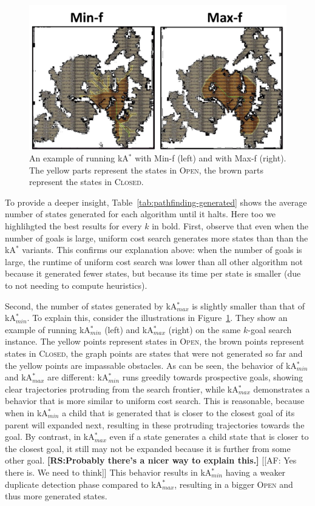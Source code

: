 \documentclass{aicom2e}
\newcommand{\kgs}{$k$-goal search}
\newcommand{\kastar}{kA$^*$}
\newcommand{\kastarmin}{kA$^*_{min}$}
\newcommand{\kastarmax}{kA$^*_{max}$}
\newcommand{\minf}{Min-f}
\newcommand{\maxf}{Max-f}
\newcommand{\open}{\textsc{Open}}
\newcommand{\closed}{\textsc{Closed}}
\newcommand{\roni}[1]{\textbf{[RS:#1]}}
\begin{document}
\begin{figure}
	\includegraphics[width=\columnwidth]{min-vs-max}      
	\caption{An example of running \kastar{} with \minf{} (left) and with \maxf{} (right). The yellow parts represent the states in \open{}, the brown parts represent the states in \closed{}.}
	\label{fig:min-vs-max}
\end{figure}

To provide a deeper insight, Table~\ref{tab:pathfinding-generated} shows the average number of states generated for each algorithm until it halts. Here too we highlihgted the best results for every $k$ in bold. 
First, observe that even when the number of goals is large, uniform cost search generates more states than than the \kastar{} variants. This confirms our explanation above: when the number of goals is large, the  runtime of uniform cost search was lower than all other algorithm not because it generated fewer states, but because its time per state is smaller (due to not needing to compute heuristics). 

Second, the number of states generated by \kastarmax{} is slightly smaller than that of \kastarmin{}. To explain this, consider the illustrations in Figure~\ref{fig:min-vs-max}. They show an example of running \kastarmin{} (left) and \kastarmax{} (right) on the same \kgs{} instance. The yellow points represent states in \open{}, the brown points represent states in \closed{}, the graph points are states that were not generated so far and the yellow points are impassable obstacles. As can be seen, the behavior of \kastarmin{} and \kastarmax{} are different: \kastarmin{} runs greedily towards prospective goals, showing clear trajectories protruding from the search frontier, while \kastarmax{} demonstrates a behavior that is more similar to uniform cost search. This is reasonable, because when in \kastarmin{} a child that is generated that is closer to the closest goal of its parent will expanded next, resulting in these protruding trajectories towards the goal. By contrast, in \kastarmax{} even if a state generates a child state that is closer to the closest goal, it still may not be expanded because it is further from some other goal. \roni{Probably there's a nicer way to explain this.} 
[[AF: Yes there	is. We need to think]]
This behavior results in \kastarmin{} having a weaker duplicate detection phase compared to \kastarmax{}, resulting in a bigger \open{} and thus more generated states. 
\end{document}
